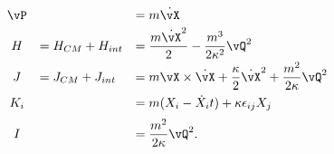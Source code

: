 \begin{equation}
     \begin{array}{ccc}
	\vP&&=m\dot{\vX}\hfill
	\\[3pt]
	H&=H_{CM}+H_{int}\hfill&=
	\displaystyle\frac{m\dot{\vX}^2}{2}-
	\displaystyle\frac{m^3}{2\kappa^2}\vQ^2\hfill
	\\[6pt]
	J&=J_{CM}+J_{int}\hfill&=
	m\vX\times\dot{\vX}+\displaystyle\frac{\kappa}{2}\dot{\vX}^2+
	\displaystyle\frac{m^2}{2\kappa}\vQ^2\hfill
	\\[8pt]
	K_{i}&&=m(X_{i}-\dot{X}_{i}t)+\kappa\epsilon_{ij}X_{j}\hfill
	\\[6pt]
	I&&=\displaystyle\frac{m^2}{2\kappa}\vQ^2.\hfill
     \end{array}
     \label{decompCC}
\end{equation}


